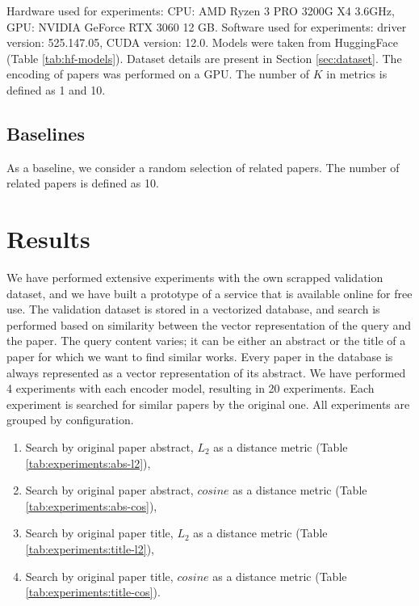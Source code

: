 \documentclass{article}
\begin{document}
        Hardware used for experiments: CPU: AMD Ryzen 3 PRO 3200G X4 3.6GHz, GPU: NVIDIA GeForce RTX 3060 12 GB. Software used for experiments: driver version: 525.147.05, CUDA version: 12.0.  Models were taken from HuggingFace (Table \ref{tab:hf-models}). Dataset details are present in Section \ref{sec:dataset}. The encoding of papers was performed on a GPU. The number of \(K\) in metrics is defined as 1 and 10.
    
    \subsection{Baselines}
            
        As a baseline, we consider a random selection of related papers. The number of related papers is defined as 10. 
    
    \section{Results}
        We have performed extensive experiments with the own scrapped validation dataset, and we have built a prototype of a service that is available online for free use. The validation dataset is stored in a vectorized database, and search is performed based on similarity between the vector representation of the query and the paper. The query content varies; it can be either an abstract or the title of a paper for which we want to find similar works. Every paper in the database is always represented as a vector representation of its abstract. We have performed 4 experiments with each encoder model, resulting in 20 experiments. Each experiment is searched for similar papers by the original one. All experiments are grouped by configuration.
        
        \begin{enumerate}
            \item Search by original paper abstract, \(L_{2}\) as a distance metric (Table \ref{tab:experiments:abs-l2}),
            \item Search by original paper abstract, \(cosine\) as a distance metric (Table \ref{tab:experiments:abs-cos}),
            \item Search by original paper title, \(L_{2}\) as a distance metric (Table \ref{tab:experiments:title-l2}),
            \item Search by original paper title, \(cosine\) as a distance metric  (Table \ref{tab:experiments:title-cos}).
        \end{enumerate}
    
\end{document}
